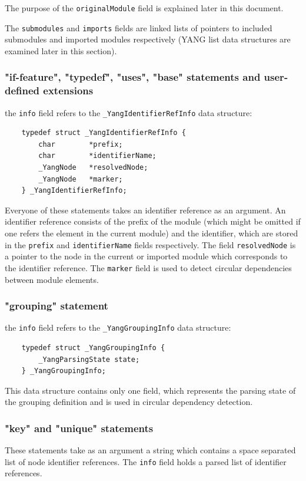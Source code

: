 \documentclass[conference]{IEEEtran}
\begin{document}
The purpose of the \texttt{originalModule} field is explained later in this document.

The \texttt{submodules} and \texttt{imports} fields are linked lists of pointers to included submodules and imported modules respectively (YANG list data structures are examined later in this section).

\subsubsection{"if-feature", "typedef", "uses", "base" statements and user-defined extensions}
the \texttt{info} field refers to the \texttt{\_YangIdentifierRefInfo} data structure:
\small
\begin{verbatim}
    typedef struct _YangIdentifierRefInfo {
        char        *prefix;
        char        *identifierName;
        _YangNode   *resolvedNode;
        _YangNode   *marker;
    } _YangIdentifierRefInfo;
\end{verbatim}
\normalsize
Everyone of these statements takes an identifier reference as an argument. An identifier reference consists of the prefix of the module (which might be omitted if one refers the element in the current module) and the identifier, which are stored in the \texttt{prefix} and \texttt{identifierName} fields respectively. The field \texttt{resolvedNode} is a pointer to the node in the current or imported module which corresponds to the identifier reference. The \texttt{marker} field is used to detect circular dependencies between module elements.

\subsubsection{"grouping" statement}
the \texttt{info} field refers to the \texttt{\_YangGroupingInfo} data structure:
\small
\begin{verbatim}
    typedef struct _YangGroupingInfo {
        _YangParsingState state;
    } _YangGroupingInfo;
\end{verbatim}
\normalsize
This data structure contains only one field, which represents the parsing state of the grouping definition and is used in circular dependency detection.

\subsubsection{"key" and "unique" statements}
These statements take as an argument a string which contains a space separated list of node identifier references. The \texttt{info} field holds a parsed list of identifier references.
\end{document}
